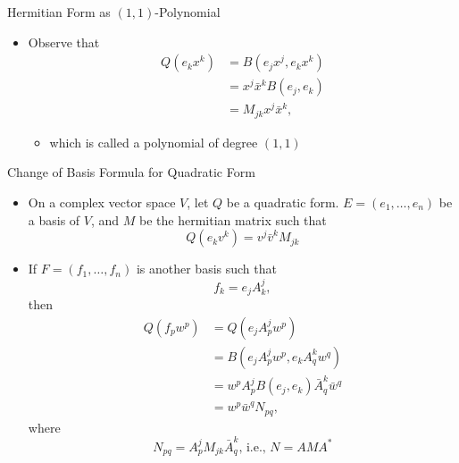 \documentclass[usenames,dvipsnames,10pt]{beamer}
\begin{document}
\begin{frame}
  {Hermitian Form as $(1,1)$-Polynomial}

  \begin{itemize}
    
  \item Observe that
    \begin{align*}
      Q(e_kx^k) &= B(e_jx^j,e_kx^k)\\
                &= x^j\bar{x}^kB(e_j,e_k)\\
                &= M_{jk}x^j\bar{x}^k,
    \end{align*}
    \begin{itemize}
    \item which is called a polynomial of degree $(1,1)$
    \end{itemize}
  \end{itemize}
\end{frame}

\begin{frame}
  {Change of Basis Formula for Quadratic Form}

  \begin{itemize}
  \item On a complex vector space $V$, let $Q$ be a quadratic form.
    $E = (e_1, \dots, e_n)$ be a basis of $V$, and $M$ be the hermitian matrix such that
    \[
      Q(e_kv^k) = v^j\bar{v}^kM_{jk}
    \]
  \item If $F = (f_1, \dots, f_n)$ is another basis such that
    \[
      f_k = e_jA_k^j,
    \]
    then
    \begin{align*}
      Q(f_pw^p) &= Q(e_jA^j_pw^p)\\ &= B(e_jA^j_pw^p,e_kA^k_qw^q)\\
                &= w^pA^j_pB(e_j,e_k)\bar{A}^k_q\bar{w}^q\\
                &= w^p\bar{w}^q N_{pq},
    \end{align*}
    where
    \[ N_{pq} = A^j_pM_{jk}\bar{A}^k_q\text{, i.e., } N = AMA^*\]
  \end{itemize}
\end{frame}
\end{document}
